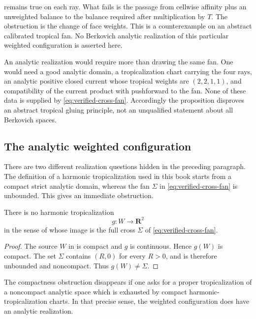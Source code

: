 \begin{remark}
\label{rem:verified-cross-failed}
 remains true on each ray.
What fails is the passage from cellwise affinity plus an unweighted
balance to the balance required after multiplication by $T$.
The obstruction is the change of face weights.
This is a counterexample on an abstract calibrated tropical fan. No
Berkovich analytic realization of this particular weighted configuration is
asserted here.
\end{remark}

An analytic realization would require more than drawing the same fan. One
would need a good analytic domain, a tropicalization chart carrying the four
rays, an analytic positive closed current whose tropical weights are
$(2,2,1,1)$, and compatibility of the current product with pushforward to
the fan. None of these data is supplied by
\eqref{eq:verified-cross-fan}. Accordingly the proposition disproves an
abstract tropical gluing principle, not an unqualified statement about all
Berkovich spaces.

\subsection{The analytic weighted configuration}
\label{sec:verified-cross-analytic}

There are two different realization questions hidden in the preceding
paragraph.  The definition of a harmonic tropicalization used in this book
starts from a compact strict analytic domain, whereas the fan
$\Sigma$ in \eqref{eq:verified-cross-fan} is unbounded.  This gives an
immediate obstruction.

\begin{proposition}
\label{prop:verified-cross-compact-obstruction}
There is no harmonic tropicalization
\[
                         g:W\longrightarrow\mathbf R^2
\]
in the sense of  whose image is the full
cross $\Sigma$ of \eqref{eq:verified-cross-fan}.
\end{proposition}

\begin{proof}
The source $W$ in  is compact and
$g$ is continuous.  Hence $g(W)$ is compact.  The set $\Sigma$
contains $(R,0)$ for every $R>0$, and is therefore unbounded and
noncompact.  Thus $g(W)\ne\Sigma$.
\end{proof}

The compactness obstruction disappears if one asks for a proper
tropicalization of a noncompact analytic space which is exhausted by
compact harmonic-tropicalization charts.  In that precise sense, the
weighted configuration does have an analytic realization.


